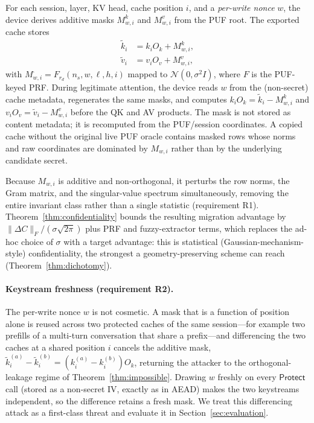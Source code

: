 For each session, layer, KV head, cache position $i$, and a \emph{per-write nonce} $w$, the device derives additive masks $M^k_{w,i}$ and $M^v_{w,i}$ from the PUF root. The exported cache stores
\begin{align}
    \tilde{k}_{i} &= k_i O_k + M^k_{w,i}, \\
    \tilde{v}_{i} &= v_i O_v + M^v_{w,i},
\end{align}
with $M^\cdot_{w,i}=F_{r_d}(n_s,w,\ell,h,i)$ mapped to $\mathcal{N}(0,\sigma^2 I)$, where $F$ is the PUF-keyed PRF. During legitimate attention, the device reads $w$ from the (non-secret) cache metadata, regenerates the same masks, and computes $k_iO_k=\tilde{k}_i-M^k_{w,i}$ and $v_iO_v=\tilde{v}_i-M^v_{w,i}$ before the QK and AV products. The mask is not stored as content metadata; it is recomputed from the PUF/session coordinates. A copied cache without the original live PUF oracle contains masked rows whose norms and raw coordinates are dominated by $M_{w,i}$ rather than by the underlying candidate secret.

Because $M_{w,i}$ is additive and non-orthogonal, it perturbs the row norms, the Gram matrix, and the singular-value spectrum simultaneously, removing the entire invariant class rather than a single statistic (requirement R1). Theorem~\ref{thm:confidentiality} bounds the resulting migration advantage by $\lVert\Delta C\rVert_F/(\sigma\sqrt{2\pi})$ plus PRF and fuzzy-extractor terms, which replaces the ad-hoc choice of $\sigma$ with a target advantage: this is statistical (Gaussian-mechanism-style) confidentiality, the strongest a geometry-preserving scheme can reach (Theorem~\ref{thm:dichotomy}).

\paragraph{Keystream freshness (requirement R2).} The per-write nonce $w$ is not cosmetic. A mask that is a function of position alone is reused across two protected caches of the same session---for example two prefills of a multi-turn conversation that share a prefix---and differencing the two caches at a shared position $i$ cancels the additive mask, $\tilde{k}^{(a)}_i-\tilde{k}^{(b)}_i=(k^{(a)}_i-k^{(b)}_i)O_k$, returning the attacker to the orthogonal-leakage regime of Theorem~\ref{thm:impossible}. Drawing $w$ freshly on every $\mathsf{Protect}$ call (stored as a non-secret IV, exactly as in AEAD) makes the two keystreams independent, so the difference retains a fresh mask. We treat this differencing attack as a first-class threat and evaluate it in Section~\ref{sec:evaluation}.

